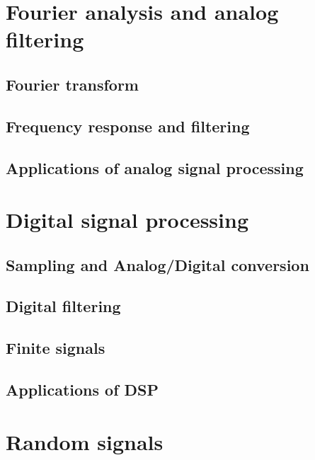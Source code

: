 \documentclass[a4paper, 10pt, dvipsnames]{book}
\begin{document}
\cite{haykin2007signals,oppenheim1997signals}

\chapter{Fourier analysis and analog filtering}
\label{chap:fourier-analog}


\section{Fourier transform}
\label{sec:fourier-transform}
\section{Frequency response and filtering}
\label{sec:freq-response}
\section{Applications of analog signal processing}
\label{sec:appli-ft}

\chapter{Digital signal processing}
\label{chap:dsp}


\section{Sampling and Analog/Digital conversion}
\label{sec:}

\section{Digital filtering}
\label{sec:}

\section{Finite signals}
\label{sec:}

\section{Applications of DSP}
\label{sec:}


\chapter{Random signals}
\end{document}
